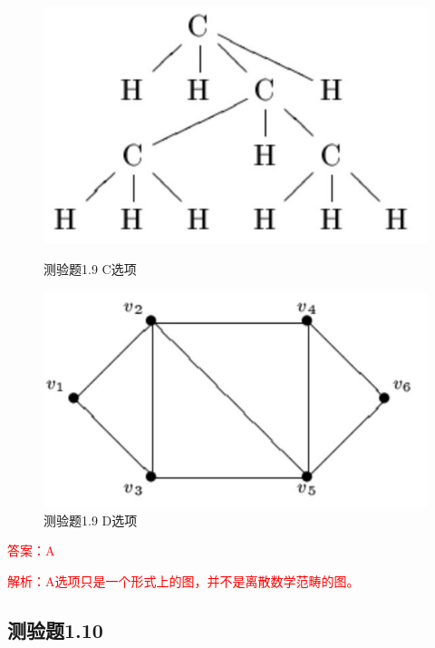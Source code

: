 \documentclass[UTF8, heading=true]{ctexart}
\begin{document}
\begin{figure}[H]
  \centering
  \begin{minipage}[t]{0.35\textwidth}
      \centering
      \includegraphics[width=1\textwidth]{1.9_3.jpg} %
      \caption{测验题1.9 C选项}
  \end{minipage}
  \hfill
  \begin{minipage}[t]{0.35\textwidth}
      \centering
      \includegraphics[width=1\textwidth]{1.9_4.jpg} %
      \caption{测验题1.9 D选项}
\end{minipage}
\end{figure}

\textcolor{red}{答案：A}

\textcolor{red}{解析：A选项只是一个形式上的图，并不是离散数学范畴的图。}

\subsection{测验题1.10}
\end{document}
